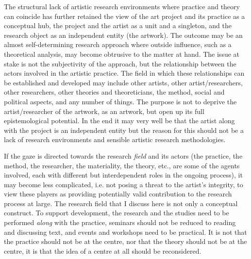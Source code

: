 \documentclass[12pt]{article}
\begin{document}
The structural lack of artistic research environments where practice and theory can coincide has further retained the view of the art project and its practice as a conceptual hub, the project and the artist as a unit and a singleton, and the research object as an independent entity (the artwork). The outcome may be an almost self-determining research approach where outside influence, such as a theoretical analysis, may become obtrusive to the matter at hand. The issue at stake is not the subjectivity of the approach, but the relationship between the actors involved in the artistic practice. The field in which these relationships can be established and developed may include other artists, other artist/researchers, other researchers, other theories and theoreticians, the method, social and political aspects, and any number of things. The purpose is not to deprive the artist/researcher of the artwork, as an artwork, but open up its full epistemological potential. In the end it may very well be that the artist along with the project is an independent entity but the reason for this should not be a lack of research environments and sensible artistic research methodologies.


If the gaze is directed towards the research \emph{field} and its actors (the practice, the method, the researcher, the materiality, the theory, etc., are some of the agents involved, each with different but interdependent roles in the ongoing process), it may become less complicated, i.e. not posing a threat to the artist's integrity, to view these players as providing potentially valid contribution to the research process at large. The research field that I discuss here is not only a conceptual construct. To support development, the research and the studies need to be performed \emph{along} with the practice, seminars should not be reduced to reading and discussing text, and events and workshops need to be practical. It is not that the practice should not be at the centre, nor that the theory should not be at the centre, it is that the idea of a centre at all should be reconsidered. 
\end{document}
